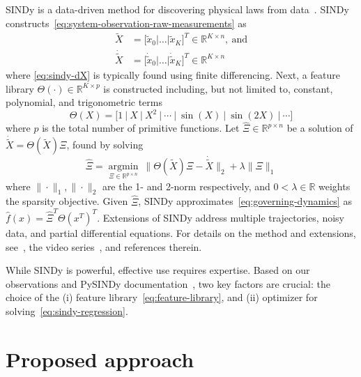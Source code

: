 \documentclass{article}
\begin{document}
SINDy is a data-driven method for discovering physical laws from data~\cite{Brunton2016}.
SINDy constructs~\eqref{eq:system-observation-raw-measurements} as
\begin{subequations}
    \begin{align}
        \widetilde{X} &= \big[ \widetilde{x}_0 | \dots | \widetilde{x}_K \big]^T \in \mathbb{R}^{K \times n},~\text{and}\label{eq:sindy-X}\\
        \dot{\widetilde{X}} &= \big[ \dot{\widetilde{x}}_0 | \dots | \dot{\widetilde{x}}_K \big]^T \in \mathbb{R}^{K \times n}\label{eq:sindy-dX}
    \end{align}
\end{subequations}
where \eqref{eq:sindy-dX} is typically found using finite differencing.
Next, a feature library $\Theta(\cdot)\in\mathbb{R}^{K\times p}$ is constructed including, but not limited to, constant, polynomial, and trigonometric terms
\begin{equation}\label{eq:feature-library}
    \Theta(X) = \Big[1~|~X~|~X^2~|~\cdots~|~\sin(X)~|~\sin(2X)~|~\cdots\Big]
\end{equation}
where $p$ is the total number of primitive functions.
Let $\widehat{\Xi}\in\mathbb{R}^{p\times n}$ be a solution of $\dot{\widetilde{X}} = \Theta(\widetilde{X})\Xi$, found by solving 
\begin{equation}\label{eq:sindy-regression}
    \widehat{\Xi} = \underset{\Xi\in\mathbb{R}^{p\times n}}{\text{arg}\min}~\big\|\Theta(\widetilde{X})\Xi - \dot{\widetilde{X}}\big\|_2 + \lambda \|\Xi\|_1
\end{equation}
where $\|\cdot\|_1, \|\cdot\|_2$ are the 1- and 2-norm respectively,
and $0 < \lambda\in\mathbb{R}$ weights the sparsity objective.
Given $\widehat{\Xi}$, SINDy approximates~\eqref{eq:governing-dynamics} as $\widehat{f}(x) = \widehat{\Xi}^T\Theta(x^T)^T$. 
Extensions of SINDy address multiple trajectories, noisy data, and partial differential equations.
For details on the method and extensions, see~\cite{Brunton16b}, the video series~\cite{brunton2021sindy}, and references therein.

While SINDy is powerful, effective use requires expertise. 
Based on our observations and PySINDy documentation~\cite{deSilva2020}, two key factors are crucial:
the choice of the
(i) feature library~\eqref{eq:feature-library}, and (ii) optimizer for solving~\eqref{eq:sindy-regression}.

\section{Proposed approach}
\end{document}
